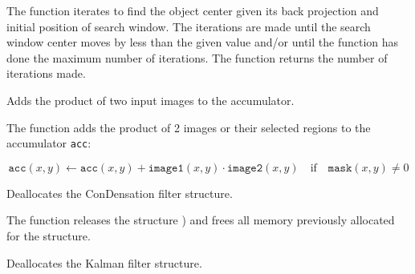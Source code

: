 The function iterates to find the object center
given its back projection and initial position of search window. The
iterations are made until the search window center moves by less than
the given value and/or until the function has done the maximum number
of iterations. The function returns the number of iterations made.

Adds the product of two input images to the accumulator.


\begin{description}
\end{description}

The function adds the product of 2 images or their selected regions to the accumulator \texttt{acc}:

\[ \texttt{acc}(x,y) \leftarrow \texttt{acc}(x,y) + \texttt{image1}(x,y) \cdot \texttt{image2}(x,y) \quad \text{if} \quad \texttt{mask}(x,y) \ne 0 \]

Deallocates the ConDensation filter structure.

\begin{description}
\end{description}

The function releases the structure ) and frees all memory previously allocated for the structure.

Deallocates the Kalman filter structure.


